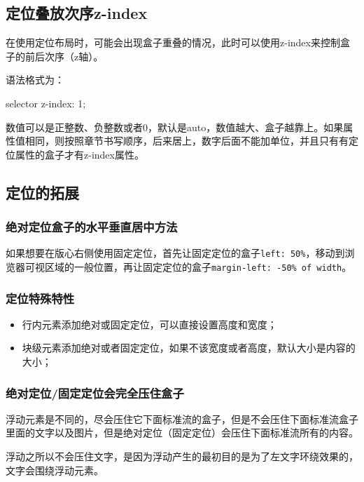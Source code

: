 \subsection{定位叠放次序z-index}
在使用定位布局时，可能会出现盒子重叠的情况，此时可以使用z-index来控制盒子的前后次序（z轴）。

语法格式为：
\begin{css}
    selector {
    z-index: 1;
    }
\end{css}

数值可以是正整数、负整数或者0，默认是auto，数值越大、盒子越靠上。如果属性值相同，则按照章节书写顺序，后来居上，数字后面不能加单位，并且只有有定位属性的盒子才有z-index属性。
\subsection{定位的拓展}
\subsubsection{绝对定位盒子的水平垂直居中方法}
如果想要在版心右侧使用固定定位，首先让固定定位的盒子\verb|left: 50%|，移动到浏览器可视区域的一般位置，再让固定定位的盒子\verb|margin-left: -50% of width|。

\subsubsection{定位特殊特性}
\begin{itemize}
    \item 行内元素添加绝对或固定定位，可以直接设置高度和宽度；
    \item 块级元素添加绝对或者固定定位，如果不该宽度或者高度，默认大小是内容的大小；
\end{itemize}
\subsubsection{绝对定位/固定定位会完全压住盒子}
浮动元素是不同的，尽会压住它下面标准流的盒子，但是不会压住下面标准流盒子里面的文字以及图片，但是绝对定位（固定定位）会压住下面标准流所有的内容。

浮动之所以不会压住文字，是因为浮动产生的最初目的是为了左文字环绕效果的，文字会围绕浮动元素。



